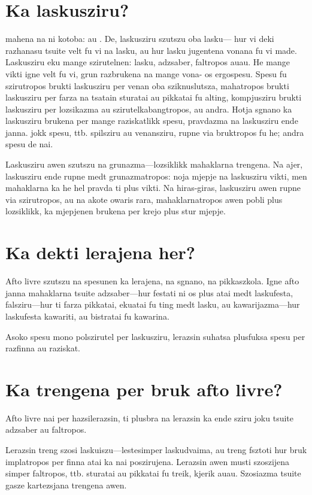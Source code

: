 
\section{Ka laskusziru?}
 mahena na ni kotoba:  au . De, laskusziru
szutszu oba lasku--- hur vi deki razhanasu tsuite velt fu vi na lasku,
au hur lasku jugentena vonana fu vi made. Laskusziru eku mange szirutelnen:
lasku, adzsaber, faltropos auau. He mange vikti igne velt fu vi, grun
razbrukena na mange vona- os ergospesu. Spesu fu szirutropos brukti laskusziru
per venan oba sziknuslutsza, mahatropos brukti laskusziru per farza na tsatain
sturatai au pikkatai fu alting, kompjusziru brukti laskusziru per lozsikazma au
szirutelkabangtropos, au andra. Hotja sgnano ka laskusziru brukena per mange
raziskatlikk spesu, pravdazma na laskusziru ende janna. jokk spesu, ttb.
spilsziru au venansziru, rupne via bruktropos fu he; andra spesu de nai.

Laskusziru awen szutszu na grunazma---lozsiklikk mahaklarna trengena. Na ajer,
laskusziru ende rupne medt grunazmatropos: noja mjepje na laskusziru vikti,
men mahaklarna ka he hel pravda ti plus vikti. Na hiras-giras, laskusziru
awen rupne via szirutropos, au na akote owaris rara, mahaklarnatropos awen
pobli plus lozsiklikk, ka mjepjenen brukena per krejo plus stur mjepje.

\section{Ka dekti lerajena her?}
Afto livre szutszu na spesunen ka lerajena, na sgnano, na pikkaszkola. Igne
afto janna mahaklarna tsuite adzsaber---hur festati ni os plus atai medt
laskufesta, falsziru---hur ti farza pikkatai, ekuatai fu ting medt lasku,
au kawarijazma---hur laskufesta kawariti, au bistratai fu kawarina.

Asoko spesu mono polszirutel per laskusziru, lerazsin suhatsa plusfuksa
spesu per razfinna au raziskat.

\section{Ka trengena per bruk afto livre?}
Afto livre nai per hazsilerazsin, ti plusbra na lerazsin ka ende sziru joku
tsuite adzsaber au faltropos.

Lerazsin treng szosi laskuiszu---lestesimper laskudvaima, au treng fsztoti hur
bruk implatropos per finna atai ka nai poszirujena. Lerazsin
awen musti szoszijena simper faltropos, ttb. sturatai au pikkatai
fu treik, kjerik auau. Szosiazma tsuite gasze kartezsjana trengena awen.

